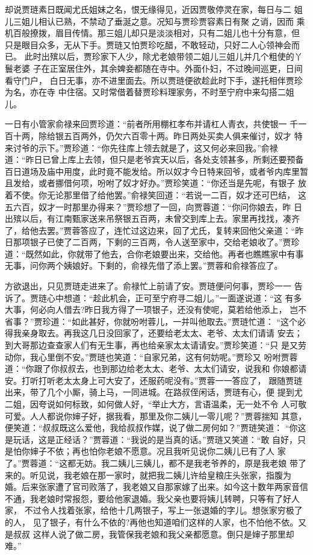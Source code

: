 却说贾琏素日既闻尤氏姐妹之名，恨无缘得见，近因贾敬停灵在家，每日与二
姐儿三姐儿相认已熟，不禁动了垂涎之意。况知与贾珍贾容素日有聚之诮，因而
乘机百般撩拨，眉目传情。那三姐儿却只是淡淡相对，只有二姐儿也十分有意，但
只是眼目众多，无从下手。贾琏又怕贾珍吃醋，不敢轻动，只好二人心领神会而已。
此时出殡以后，贾珍家下人少，除尤老娘带领二姐儿三姐儿并几个粗使的丫鬟老婆
子在正室居住外，其余婢妾都随在寺中。外面仆妇，不过晚间巡更，日间看守门户，
白日无事，亦不进里面去。所以贾琏便欲趁此时下手，遂托相伴贾珍为名，亦在寺
中住宿。又时常借着替贾珍料理家务，不时至宁府中来勾搭二姐儿。

一日有小管家俞禄来回贾珍道：“前者所用棚杠孝布并请杠人青衣，共使银一
千一百十两，除给银五百两外，仍欠六百零十两。昨日两处买卖人俱来催讨，奴才
特来讨爷的示下。”贾珍道：“你先往库上领去就是了，这又何必来回我。”俞禄
道：“昨日已曾上库上去领，但只是老爷宾天以后，各处支领甚多，所剩还要预备
百日道场及庙中用度，此时竟不能发给。所以奴才今日特来回爷，或者爷内库里暂
且发给，或者挪借何项，吩咐了奴才好办。”贾珍笑道：“你还当是先呢，有银子
放着不使。你无论那里借了给他罢。”俞禄笑回道：“若说一二百，奴才还可巴结，
这五六百，奴才一时那里办得来？”贾珍想了一回，向贾蓉道：“你问你娘去，昨
日出殡以后，有江南甄家送来吊祭银五百两，未曾交到库上去。家里再找找，凑齐
了，给他去罢。”贾蓉答应了，连忙过这边来，回了尤氏，复转来回他父亲道：“昨
日那项银子已使了二百两，下剩的三百两，令人送至家中，交给老娘收了。”贾珍
道：“既然如此，你就带了他去，合你老娘要出来，交给他。再者也瞧瞧家中有事
无事，问你两个姨娘好。下剩的，俞禄先借了添上罢。”贾蓉和俞禄答应了。

方欲退出，只见贾琏走进来了。俞禄忙上前请了安。贾琏便问何事，贾珍一一
告诉了。贾琏心中想道：“趁此机会，正可至宁府寻二姐儿。”一面遂说道：“这
有多大事，何必向人借去?昨日我方得了一项银子，还没有使呢，莫若给他添上，
岂不省事？”贾珍道：“如此甚好，你就吩咐蓉儿，一并叫他取去。”贾琏忙道：
“这个必得我亲身取去。再我这几日没回家了，还要给老太太、老爷、太太们请请
安去；到大哥那边查查家人们有无生事，再也给亲家太太请请安。”贾珍笑道：“只
是又劳动你，我心里倒不安。”贾琏也笑道：“自家兄弟，这有何妨呢。”贾珍又
吩咐贾蓉道：“你跟了你叔叔去，也到那边给老太太、老爷、太太们请安，说我和
你娘都请安。打听打听老太太身上可大安了，还服药呢没有。”贾蓉一一答应了，
跟随贾琏出来，带了几个小厮，骑上马，一同进城。在路叔侄闲话，贾琏有心，便
提到尤二姐，因夸说如何标致，如何做人好，“举止大方，言语温柔，无一处不令
人可敬可爱。人人都说你婶子好，据我看，那里及你二姨儿一零儿呢？”贾蓉揣知
其意，便笑道：“叔叔既这么爱他，我给叔叔作媒，说了做二房何如？”贾琏笑道：
“你这是玩话，这是正经话？”贾蓉道：“我说的是当真的话。”贾琏又笑道：“敢
自好，只是怕你婶子不依；再也怕你老娘不愿意。况且我听见说你二姨儿已有了人
家了。”贾蓉道：“这都无妨。我二姨儿三姨儿，都不是我老爷养的，原是我老娘
带了来的。听见说，我老娘在那一家时，就把我二姨儿许给皇粮庄头张家，指腹为
婚。后来张家遭了官司败落了，我老娘又自那家嫁了出来。如今这十数年两家音信
不通，我老娘时常报怨，要给他家退婚。我父亲也要将姨儿转聘，只等有了好人家，
不过令人找着张家，给他十几两银子，写上一张退婚的字儿。想张家穷极了的人，
见了银子，有什么不依的?再他也知道咱们这样的人家，也不怕他不依。又是叔叔
这样人说了做二房，我管保我老娘和我父亲都愿意。倒只是婶子那里却难。”

